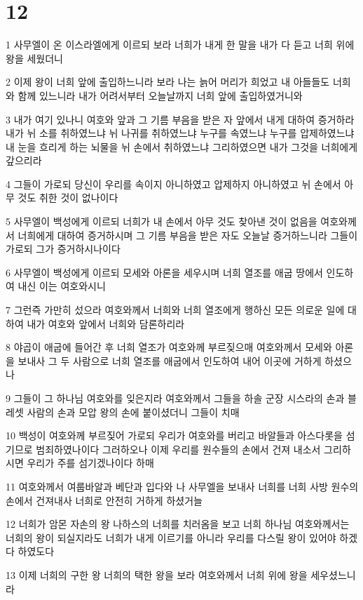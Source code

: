 \chapter{12}

\par 1 사무엘이 온 이스라엘에게 이르되 보라 너희가 내게 한 말을 내가 다 듣고 너희 위에 왕을 세웠더니
\par 2 이제 왕이 너희 앞에 출입하느니라 보라 나는 늙어 머리가 희었고 내 아들들도 너희와 함께 있느니라 내가 어려서부터 오늘날까지 너희 앞에 출입하였거니와
\par 3 내가 여기 있나니 여호와 앞과 그 기름 부음을 받은 자 앞에서 내게 대하여 증거하라 내가 뉘 소를 취하였느냐 뉘 나귀를 취하였느냐 누구를 속였느냐 누구를 압제하였느냐 내 눈을 흐리게 하는 뇌물을 뉘 손에서 취하였느냐 그리하였으면 내가 그것을 너희에게 갚으리라
\par 4 그들이 가로되 당신이 우리를 속이지 아니하였고 압제하지 아니하였고 뉘 손에서 아무 것도 취한 것이 없나이다
\par 5 사무엘이 백성에게 이르되 너희가 내 손에서 아무 것도 찾아낸 것이 없음을 여호와께서 너희에게 대하여 증거하시며 그 기름 부음을 받은 자도 오늘날 증거하느니라 그들이 가로되 그가 증거하시나이다
\par 6 사무엘이 백성에게 이르되 모세와 아론을 세우시며 너희 열조를 애굽 땅에서 인도하여 내신 이는 여호와시니
\par 7 그런즉 가만히 섰으라 여호와께서 너희와 너희 열조에게 행하신 모든 의로운 일에 대하여 내가 여호와 앞에서 너희와 담론하리라
\par 8 야곱이 애굽에 들어간 후 너희 열조가 여호와께 부르짖으매 여호와께서 모세와 아론을 보내사 그 두 사람으로 너희 열조를 애굽에서 인도하여 내어 이곳에 거하게 하셨으나
\par 9 그들이 그 하나님 여호와를 잊은지라 여호와께서 그들을 하솔 군장 시스라의 손과 블레셋 사람의 손과 모압 왕의 손에 붙이셨더니 그들이 치매
\par 10 백성이 여호와께 부르짖어 가로되 우리가 여호와를 버리고 바알들과 아스다롯을 섬기므로 범죄하였나이다 그러하오나 이제 우리를 원수들의 손에서 건져 내소서 그리하시면 우리가 주를 섬기겠나이다 하매
\par 11 여호와께서 여룹바알과 베단과 입다와 나 사무엘을 보내사 너희를 너희 사방 원수의 손에서 건져내사 너희로 안전히 거하게 하셨거늘
\par 12 너희가 암몬 자손의 왕 나하스의 너희를 치러옴을 보고 너희 하나님 여호와께서는 너희의 왕이 되실지라도 너희가 내게 이르기를 아니라 우리를 다스릴 왕이 있어야 하겠다 하였도다
\par 13 이제 너희의 구한 왕 너희의 택한 왕을 보라 여호와께서 너희 위에 왕을 세우셨느니라
